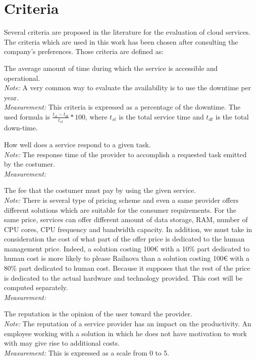 \documentclass[a4paper,11pt]{article}
\begin{document}
\section{Criteria}
Several criteria are proposed in the literature for the evaluation of cloud services. The criteria which are used in this work has been chosen after consulting the company's preferences.
Those criteria are defined as:
\begin{description}[parsep=1pt,listparindent=\parindent,labelindent=\parindent,font=$\bullet$\ ]
  \item[Availability:] The average amount of time during which the service is accessible and operational.\\
    \emph{Note:} A very common way to evaluate the availability is to use the downtime per year.\\
    \emph{Measurement:} This criteria is expressed as a percentage of the downtime. The used formula is $\frac{t_{st}-t_{dt}}{t_{st}}*100$, where $t_{st}$ is the total service time and $t_{dt}$ is the total down-time.

  \item[Service efficiency:] How well does a service respond to a given task.\\
    \emph{Note:} The response time of the provider to accomplish a requested task emitted by the costumer.\\
    \emph{Measurement:} 

  \item[Cost:] The fee that the costumer must pay by using the given service.\\
    \emph{Note:} There is several type of pricing scheme and even a same provider offers different solutions which are suitable for the consumer requirements. For the same price, services can offer different amount of data storage, RAM, number of CPU cores, CPU frequency and bandwidth capacity. In addition, we must take in consideration the cost of what part of the offer price is dedicated to the human management price. Indeed, a solution costing 100\euro{} with a 10\% part dedicated to human cost is more likely to please Railnova than a solution costing 100\euro{} with a 80\% part dedicated to human cost. Because it supposes that the rest of the price is dedicated to the actual hardware and technology provided. This cost will be computed separately.\\
    \emph{Measurement:} 

  \item[Reputation:] The reputation is the opinion of the user toward the provider.\\
    \emph{Note:} The reputation of a service provider has an impact on the productivity. An employee working with a solution in which he does not have motivation to work with may give rise to additional costs.\\
    \emph{Measurement:} This is expressed as a scale from 0 to 5.
    

\end{description}
\end{document}
